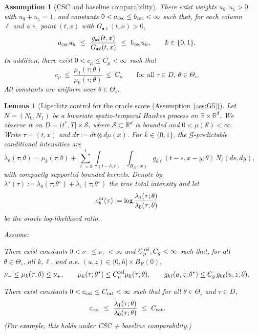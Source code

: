 \documentclass{statsoc}
\newtheorem{lemma}[lemma]{Lemma}
\newtheorem{assumption}[assumption]{Assumption}
\newcommand{\1}{\mathbbm{1}}
\begin{document}
\begin{assumption}[CSC and baseline comparability]\label{ass:CSC}
There exist weights $u_0,u_1>0$ with $u_0+u_1=1$, and constants $0<a_{\rm csc}\le b_{\rm csc}<\infty$ such that, for each column $\ell$ and a.e.\ point $(t,x)$ with $G_{\bullet\ell}(t,x)>0$,
\[
a_{\rm csc} u_k\ \le\ \frac{g_{k\ell}(t,x)}{G_{\bullet\ell}(t,x)}\ \le\ b_{\rm csc} u_k,\qquad k\in\{0,1\}.
\]
In addition, there exist $0<c_\mu\le C_\mu<\infty$ such that
\[
c_\mu\ \le\ \frac{\mu_1(\tau;\theta)}{\mu_0(\tau;\theta)}\ \le\ C_\mu\qquad \text{for all }\tau\in D,\ \theta\in\Theta_\circ.
\]
All constants are uniform over $\theta\in\Theta_\circ$.
\end{assumption}

\begin{lemma}[Lipschitz control for the oracle score (Assumption~\ref{ass:G5})]
\label{lem:hawkes-Lip-avg}
Let $N=(N_0,N_1)$ be a bivariate spatio-temporal Hawkes process on $\mathbb{R}\times\mathbb{R}^d$.
We observe it on $D=(t^\ast,T]\times \mathcal{S}$, where $\mathcal{S}\subset\mathbb{R}^d$ is bounded and $0<\mu(\mathcal{S})<\infty$.
Write $\tau=(t,x)$ and $d\tau:=dt\otimes d\mu(x)$.
For $k\in\{0,1\}$, the $\mathcal{G}$-predictable conditional intensities are
\[
\lambda_k(\tau;\theta)
=
\mu_k(\tau;\theta)
+
\sum_{\ell=0}^1\int_{(t-h,t)}\int_{B_R(x)}
g_{k\ell}(t-s,x-y;\theta)\,N_\ell(ds,dy),
\]
with compactly supported bounded kernels. Denote by $\lambda^\star(\tau):=\lambda_0(\tau;\theta^\star)+\lambda_1(\tau;\theta^\star)$ the true total
intensity and let
\[
s^{\rm or}_\theta(\tau):=\log\frac{\lambda_1(\tau;\theta)}{\lambda_0(\tau;\theta)}
\]
be the oracle log-likelihood ratio.

Assume:

\smallskip
{}
There exist constants \(0<\nu_-\le \nu_+<\infty\) and \(C_\mu^{\rm rel},C_g<\infty\) such that, for all
\(\theta\in\Theta_\circ\), all \(k,\ell\), and a.e. \((u,z)\in(0,h]\times B_R(0)\),
\[
\nu_-\le \mu_k(\tau;\theta)\le \nu_+,\qquad
\mu_k(\tau;\theta^\star)\le C_\mu^{\rm rel}\mu_k(\tau;\theta),\qquad
g_{k\ell}(u,z;\theta^\star)\le C_g\,g_{k\ell}(u,z;\theta).
\]

\smallskip
{}
There exist constants $0<c_{\rm rat}\le C_{\rm rat}<\infty$ such that for all $\theta\in\Theta_\circ$ and
$\tau\in D$,
\[
c_{\rm rat}\ \le\ \frac{\lambda_1(\tau;\theta)}{\lambda_0(\tau;\theta)}\ \le\ C_{\rm rat}.
\]
(For example, this holds under CSC + baseline comparability.)


\end{lemma}
\end{document}
